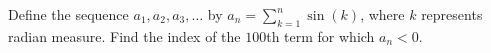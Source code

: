 Define the sequence $a_1,a_2,a_3,\ldots$ by $a_n=\sum_{k=1}^n\sin(k)$, where $k$ represents radian measure. Find the index of the $100$th term for which $a_n<0$.